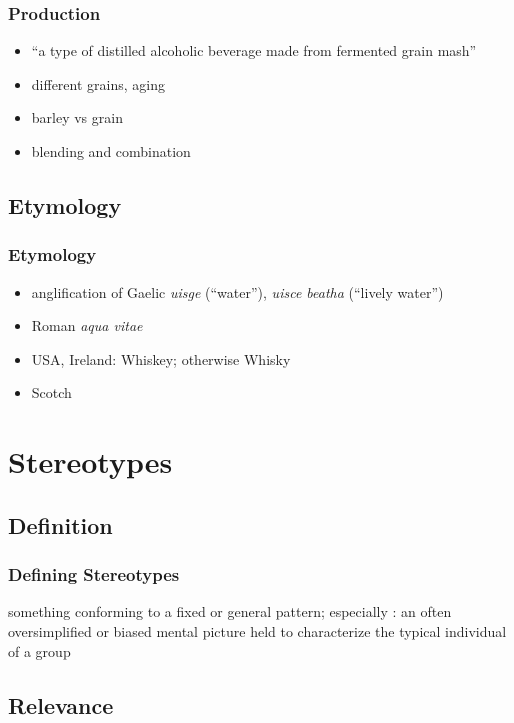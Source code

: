 \documentclass{beamer}
\begin{document}
\begin{frame}
 \frametitle{Production}
 \begin{itemize}
  \item ``a type of distilled alcoholic beverage made from fermented grain mash''
  \item different grains, aging
  \item barley vs grain
  \item blending and combination
 \end{itemize}
\end{frame}

\subsection{Etymology}

\begin{frame}
 \frametitle{Etymology}
 \begin{itemize}
  \item anglification of Gaelic \emph{uisge} (``water''), \emph{uisce beatha} (``lively water'')
  \item Roman \emph{aqua vitae}
  \item USA, Ireland: Whiskey; otherwise Whisky
  \item Scotch
 \end{itemize}
\end{frame}

\section{Stereotypes}

\subsection{Definition}

\begin{frame}
 \frametitle{Defining Stereotypes}
  \begin{definition}[Webster's]
    something conforming to a fixed or general pattern; especially : an often oversimplified or biased mental picture held to characterize the typical individual of a group
  \end{definition}
\end{frame}

\subsection{Relevance}
\end{document}

